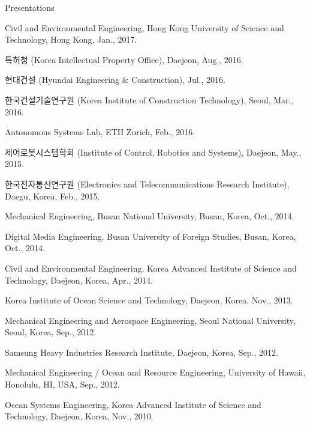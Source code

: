 \begin{rSection}{Presentations}

\begin{pubSubsection}{}
  \item Civil and Environmental Engineering, Hong Kong University of Science and Technology, Hong Kong, Jan., 2017.
  \item 특허청 (Korea Intellectual Property Office), Daejeon, Aug., 2016.
  \item 현대건설 (Hyundai Engineering \& Construction), Jul., 2016.
  \item 한국건설기술연구원 (Korea Institute of Construction Technology), Seoul, Mar., 2016.
  \item Autonomous Systems Lab, ETH Zurich, Feb., 2016.
  \item 제어로봇시스템학회 (Institute of Control, Robotics and Systems), Daejeon, May., 2015. 
  \item 한국전자통신연구원 (Electronics and Telecommunications Research Institute), Daegu, Korea, Feb., 2015.
  \item Mechanical Engineering, Busan National University, Busan, Korea, Oct., 2014.
  \item Digital Media Engineering, Busan University of Foreign Studies, Busan, Korea, Oct., 2014.
  \item Civil and Environmental Engineering, Korea Advanced Institute of Science and Technology, Daejeon, Korea, Apr., 2014.
  \item Korea Institute of Ocean Science and Technology, Daejeon, Korea, Nov., 2013.
  \item Mechanical Engineering and Aerospace Engineering, Seoul National University, Seoul, Korea, Sep., 2012.
  \item Samsung Heavy Industries Research Institute, Daejeon, Korea, Sep., 2012.
  \item Mechanical Engineering / Ocean and Resource Engineering, University of Hawaii, Honolulu, HI, USA, Sep., 2012.
  \item Ocean Systems Engineering, Korea Advanced Institute of Science and Technology, Daejeon, Korea, Nov., 2010.
\end{pubSubsection}

\end{rSection}

